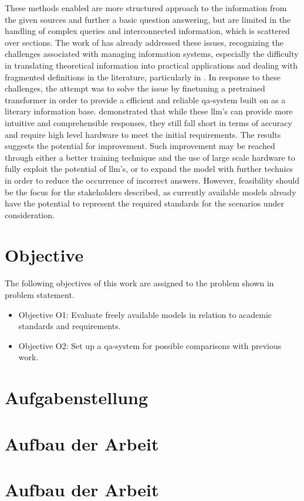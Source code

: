 These methods enabled are more structured approach to the information from the given sources and further a basic question answering, but are limited in the handling of complex queries and interconnected information, which is scattered over sections.
The work of \citet{Paul_Keller} has already addressed these issues, recognizing the challenges associated with managing information systems, especially the difficulty in translating theoretical information into practical applications and dealing with fragmented definitions in the literature, particularly in \citet{bb2}. 
In response to these challenges, the attempt was to solve the issue by finetuning a pretrained transformer in order to provide a efficient and reliable \ac{qa}-system built on \citet{bb2} as a literary information base.
\citet{Paul_Keller} demonstrated that while these \ac{llm}'s can provide more intuitive and comprehensible responses, they still fall short in terms of accuracy and require high level hardware to meet the initial requirements. 
%
The results suggests the potential for improvement. 
Such improvement may be reached through either a better training technique and the use of large scale hardware to fully exploit the potential of \ac{llm}'s, or to expand the model with further technics in order to reduce the occurrence of incorrect answers.
%
However, feasibility should be the focus for the stakeholders described, as currently available models already have the potential to represent the required standards for the scenarios under consideration. 
 
\section{Objective}\label{sec:objective}
The following objectives of this work are assigned to the problem shown in {problem statement}.
\begin{itemize}
  \item Objective O1: 
  Evaluate freely available models in relation to academic standards and requirements.
  \item Objective O2: 
  Set up a \ac{qa}-system for possible comparisons with previous work.
\end{itemize}
\section{Aufgabenstellung}
\section{Aufbau der Arbeit}



\section{Aufbau der Arbeit}
